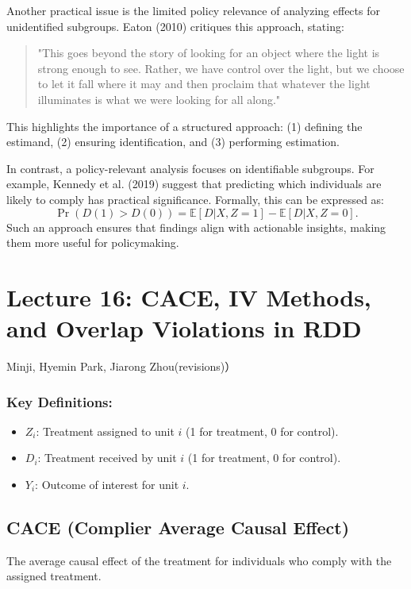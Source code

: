 Another practical issue is the limited policy relevance of analyzing effects for unidentified subgroups. Eaton (2010) critiques this approach, stating:  
\begin{quote}  
"This goes beyond the story of looking for an object where the light is strong enough to see. Rather, we have control over the light, but we choose to let it fall where it may and then proclaim that whatever the light illuminates is what we were looking for all along."  
\end{quote}  
This highlights the importance of a structured approach: (1) defining the estimand, (2) ensuring identification, and (3) performing estimation.  

In contrast, a policy-relevant analysis focuses on identifiable subgroups. For example, Kennedy et al. (2019) suggest that predicting which individuals are likely to comply has practical significance. Formally, this can be expressed as:  
\[
\Pr(D(1) > D(0)) = \mathbb{E}[D | X, Z = 1] - \mathbb{E}[D | X, Z = 0].  
\]  
Such an approach ensures that findings align with actionable insights, making them more useful for policymaking.  

\section{Lecture 16: CACE, IV Methods, and Overlap Violations in RDD }{Minji, Hyemin Park, Jiarong Zhou(revisions)）}



\subsubsection{Key Definitions:}
\begin{itemize}
    \item \( Z_i \): Treatment assigned to unit \( i \) (1 for treatment, 0 for control).
    \item \( D_i \): Treatment received by unit \( i \) (1 for treatment, 0 for control).
    \item \( Y_i \): Outcome of interest for unit \( i \).
\end{itemize}

\subsection{CACE (Complier Average Causal Effect)}
 The average causal effect of the treatment for individuals who comply with the assigned treatment. 

